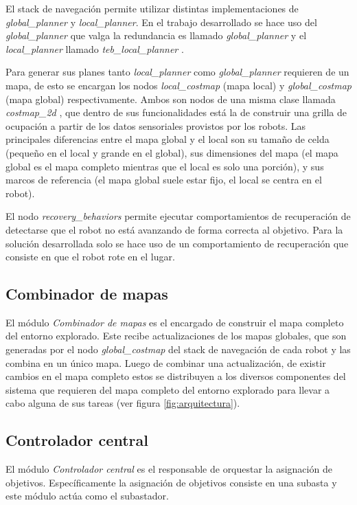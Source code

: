 El stack de navegación permite utilizar distintas implementaciones de
\emph{global\_planner} y \emph{local\_planner}. En el trabajo desarrollado se
hace uso del \emph{global\_planner} que valga la redundancia es llamado
\emph{global\_planner} \cite{ROS-global_planner}  y el \emph{local\_planner}
llamado \emph{teb\_local\_planner} \cite{ROS-teb_local_planner}.

Para generar sus planes tanto \emph{local\_planner} como \emph{global\_planner}
requieren de un mapa, de esto se encargan los nodos \emph{local\_costmap} (mapa
local) y \emph{global\_costmap} (mapa global) respectivamente. Ambos son
nodos de una misma clase llamada \emph{costmap\_2d}
\cite{ROS-costmap_2d}, que dentro de sus funcionalidades está la de
construir una grilla de ocupación a partir de los datos sensoriales provistos
por los robots. Las principales diferencias entre el mapa global y el local son su
tamaño de celda (pequeño en el local y grande en el global), sus dimensiones
del mapa (el mapa global es el mapa completo mientras que el local es solo una
porción), y sus marcos de referencia (el mapa global suele estar fijo, el local se
centra en el robot).

El nodo \emph{recovery\_behaviors} permite ejecutar comportamientos de
recuperación de detectarse que el robot no está avanzando de forma correcta al
objetivo. Para la solución desarrollada solo se hace uso de un comportamiento
de recuperación que consiste en que el robot rote en el lugar.

\subsection{Combinador de mapas}
El módulo \emph{Combinador de mapas} es el encargado de construir el mapa
completo del entorno explorado. Este recibe actualizaciones de los mapas
globales, que son generadas por el nodo \emph{global\_costmap} del stack de navegación
de cada robot y las combina en un único mapa. Luego de combinar una
actualización, de existir cambios en el mapa completo estos se distribuyen a
los diversos componentes del sistema que requieren del mapa completo del
entorno explorado para llevar a cabo alguna de sus tareas (ver figura
\ref{fig:arquitectura}). 

\subsection{Controlador central}

El módulo \emph{Controlador central} es el responsable de orquestar la
asignación de objetivos. Específicamente la asignación de objetivos consiste en
una subasta y este módulo actúa como el subastador. 

